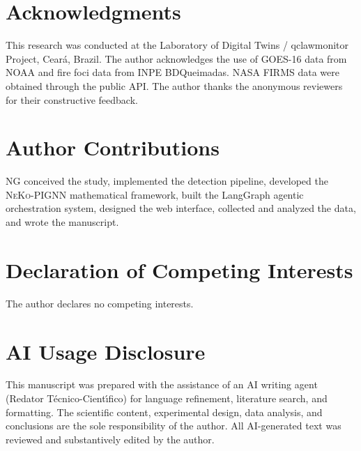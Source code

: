 \documentclass[11pt,twocolumn,a4paper]{article}
\newcommand{\abbrev}[1]{{\small\textsc{#1}}}
\begin{document}
\section*{Acknowledgments}

This research was conducted at the Laboratory of Digital Twins / qclawmonitor Project, Cear\'{a}, Brazil. The author acknowledges the use of \abbrev{GOES-16} data from \abbrev{NOAA} and fire foci data from \abbrev{INPE} BDQueimadas. \abbrev{NASA} \abbrev{FIRMS} data were obtained through the public \abbrev{API}. The author thanks the anonymous reviewers for their constructive feedback.

\section*{Author Contributions}

\abbrev{NG} conceived the study, implemented the detection pipeline, developed the \abbrev{NeKo-PIGNN} mathematical framework, built the LangGraph agentic orchestration system, designed the web interface, collected and analyzed the data, and wrote the manuscript.

\section*{Declaration of Competing Interests}

The author declares no competing interests.

\section*{AI Usage Disclosure}

This manuscript was prepared with the assistance of an \abbrev{AI} writing agent (Redator T\'ecnico-Cient\'{\i}fico) for language refinement, literature search, and formatting. The scientific content, experimental design, data analysis, and conclusions are the sole responsibility of the author. All \abbrev{AI}-generated text was reviewed and substantively edited by the author.



\end{document}
